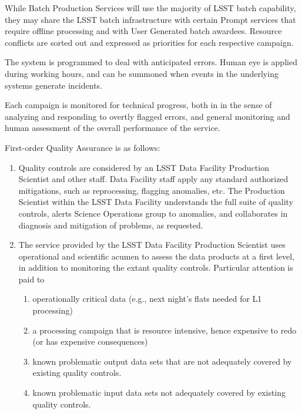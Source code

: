 While Batch Production Services will use the majority of LSST batch capability,
they may share the LSST batch infrastructure with certain Prompt services that
require offline processing and with User Generated batch awardees. Resource conflicts
are sorted out and expressed as priorities for each respective campaign.

The system is programmed to deal with anticipated errors. Human eye is applied
during working hours, and can be summoned when events in the underlying systems
 generate incidents.

Each campaign is monitored for technical progress, both in in the sense of
analyzing and responding to overtly flagged errors, and general monitoring and
human assessment of the overall performance of the service.

First-order Quality Assurance is as follows:

\begin{enumerate}

\item Quality controls are considered by an LSST Data Facility Production
Scientist and other staff. Data Facility staff apply any standard authorized
mitigations, such as reprocessing, flagging anomalies, etc. The Production
Scientist within the LSST Data Facility understands the full suite of quality
controls, alerts Science Operations group to anomalies, and collaborates in
diagnosis and mitigation of problems, as requested.

\item The service provided by the LSST Data Facility Production Scientist uses
operational and scientific acumen to assess the data products at a first level,
in addition to monitoring the extant quality controls. Particular attention is
paid to

    \begin{enumerate}

    \item operationally critical data (e.g., next night’s flats needed for L1
    processing)

    \item a processing campaign that is resource intensive, hence expensive to
    redo (or has expensive consequences)

    \item known problematic output data sets that are not adequately covered by
    existing quality controls.

    \item known problematic input data sets not adequately covered by existing
    quality controls.

    \end{enumerate}

\end{enumerate}

